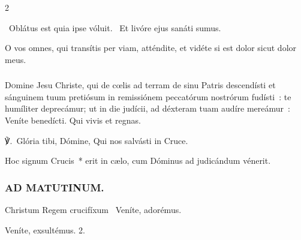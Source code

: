\documentclass[9pt,twoside]{extarticle}
\begin{document}
\begin{multicols}{2}
{\begin{tightlist}{}
\item {}~Oblátus est quia ipse vóluit. ~Et livóre ejus sanáti sumus.
\item {} O vos omnes, qui transítis per viam, atténdite, et vidéte si est dolor sicut dolor meus.
\end{tightlist}

\subsubsection*{\center {}}
\lettrine{D}omine Jesu Christe, qui de cœlis ad terram de sinu Patris descendísti et sánguinem tuum pretiósum in remissiónem peccatórum nostrórum fudísti~: te humíliter deprecámur; ut in die judícii, ad déxteram tuam audíre mereámur~: Veníte benedícti. Qui vivis et regnas.

\begin{tightlist}{}
\item {} ℣.~Glória tibi, Dómine, Qui nos salvásti in Cruce.
\item {}
\item {} Hoc signum Crucis~* erit in cælo, cum Dóminus ad judicándum vénerit.
\end{tightlist}

\subsubsection*{\center \textsc{AD MATUTINUM.}}
\begin{tightlist}{}
\item {} Christum Regem crucifíxum \textred{*}~Veníte, adorémus.
\item {} Veníte, exsultémus. 2. 
\end{tightlist}
}
\end{multicols}
\end{document}
